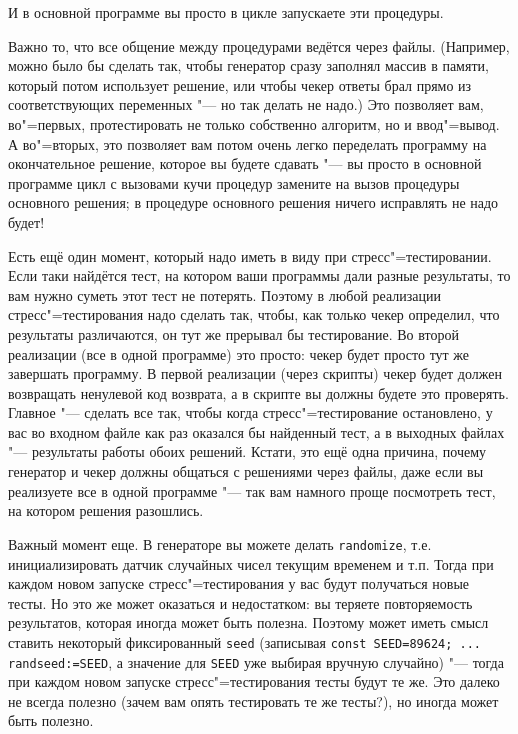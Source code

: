 И в основной программе вы просто в цикле запускаете эти процедуры.

Важно то, что все общение между процедурами ведётся через файлы. 
(Например, можно было бы сделать так, чтобы генератор сразу заполнял массив в памяти, который потом использует решение,
или чтобы чекер ответы брал прямо из соответствующих переменных "--- но так делать не надо.)
Это позволяет вам, во"=первых, протестировать не только собственно алгоритм, но и ввод"=вывод.
А во"=вторых, это позволяет вам потом очень легко переделать программу на окончательное решение, которое вы будете сдавать "---
вы просто в основной программе цикл с вызовами кучи процедур замените на вызов процедуры основного решения; 
в процедуре основного решения ничего исправлять не надо будет!

Есть ещё один момент, который надо иметь в виду при стресс"=тестировании. 
Если таки найдётся тест, на котором ваши программы дали разные результаты, то вам нужно суметь этот тест не потерять. 
Поэтому в любой реализации стресс"=тестирования надо сделать так, чтобы, как только чекер определил, что результаты различаются,
он тут же прерывал бы тестирование. 
Во второй реализации (все в одной программе) это просто: чекер будет просто тут же завершать программу.
В первой реализации (через скрипты) чекер будет должен возвращать ненулевой код возврата, 
а в скрипте вы должны будете это проверять. 
Главное "--- сделать все так, чтобы когда стресс"=тестирование остановлено, у вас во входном файле
как раз оказался бы найденный тест, а в выходных файлах "--- результаты работы обоих решений.
Кстати, это ещё одна причина, почему генератор и чекер должны общаться с решениями через файлы, даже если вы реализуете все в одной программе "---
так вам намного проще посмотреть тест, на котором решения разошлись.

Важный момент еще. В генераторе вы можете делать \verb`randomize`, т.е. инициализировать датчик случайных чисел текущим временем и т.п.
Тогда при каждом новом запуске стресс"=тестирования у вас будут получаться новые тесты. 
Но это же может оказаться и недостатком: вы теряете повторяемость результатов, которая иногда может быть полезна.
Поэтому может иметь смысл ставить некоторый фиксированный \verb`seed` (записывая \verb`const SEED=89624; ... randseed:=SEED`,
а значение для \verb`SEED` уже выбирая вручную случайно) "--- тогда при каждом новом запуске стресс"=тестирования
тесты будут те же. Это далеко не всегда полезно (зачем вам опять тестировать те же тесты?), но иногда может быть полезно.

